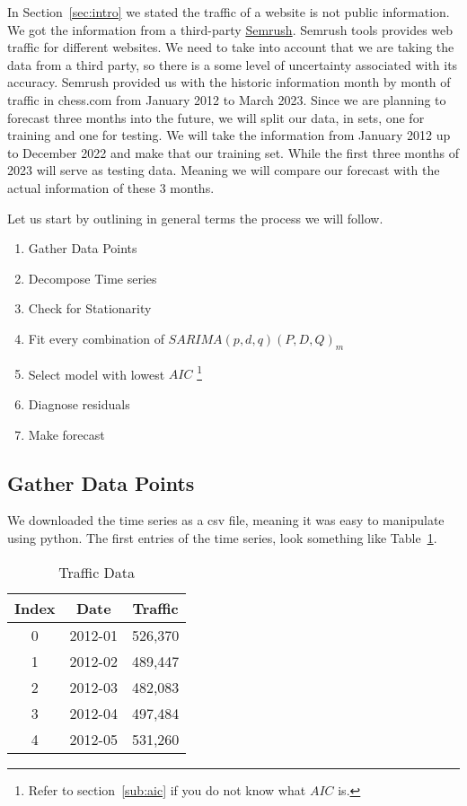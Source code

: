 \documentclass[journal]{IEEEtran}
\begin{document}
In Section~\ref{sec:intro} we stated the traffic of a website is not public
information. We got the information from a third-party
\href{http://semrush.com}{Semrush}. Semrush tools provides web traffic for
different websites. We need to take into account that we are taking the data
from a third party, so there is a some level of uncertainty associated with
its accuracy. Semrush provided us with the historic information month by month
of traffic in chess.com from January 2012 to March 2023. Since we are planning
to forecast three months into the future, we will split our data, in sets, one
for training and one for testing. We will take the information from January
2012 up to December 2022 and make that our training set. While the first three
months of 2023 will serve as testing data. Meaning we will compare our
forecast with the actual information of these 3 months.

Let us start by outlining in general terms the process we will follow.

\begin{enumerate}
    \item Gather Data Points
    \item Decompose Time series
    \item Check for Stationarity
    \item Fit every combination of $SARIMA(p,d,q)(P,D,Q)_m$
    \item Select model with lowest $AIC$ \footnote{Refer to
        section~\ref{sub:aic} if you do not know what $AIC$ is.}
    \item Diagnose residuals
    \item Make forecast
\end{enumerate}

\subsection{Gather Data Points}

We downloaded the time series as a csv file, meaning it was easy to manipulate
using python. The first entries of the time series, look something like
Table~\ref{tab:traffic}.

\begin{table}[htbp]
  \centering
  \caption{Traffic Data}
  \label{tab:traffic}
  \begin{tabular}{|c|c|c|}
    \hline
    Index & Date & Traffic \\
    \hline
    0 & 2012-01 & 526,370 \\
    1 & 2012-02 & 489,447 \\
    2 & 2012-03 & 482,083 \\
    3 & 2012-04 & 497,484 \\
    4 & 2012-05 & 531,260 \\
    \hline
  \end{tabular}
\end{table}
\end{document}
